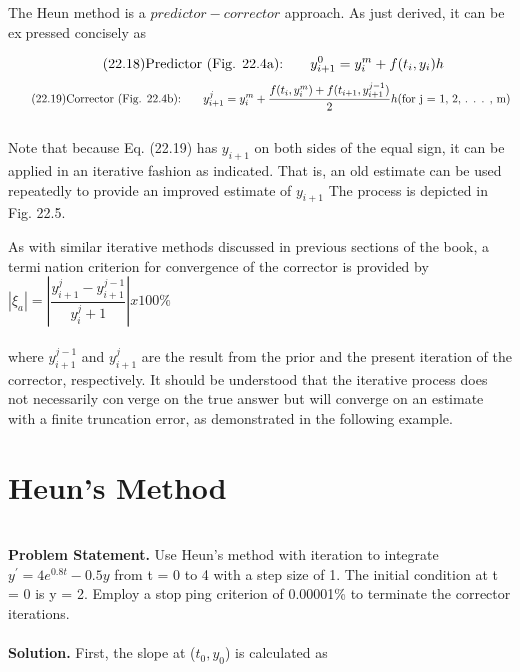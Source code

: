 The Heun method is a $predictor-corrector$ approach. As just derived, it can be expressed concisely as

\begin{equation}
\tag{22.18}
\textnormal{Predictor (Fig. 22.4a):} \; \; \; \; \; \; \; y^{0}_{i+1} = y^{m}_{i} + f(t_{i}, y_{i})h
\end{equation}
\begin{equation}
\tag{22.19}
\textnormal{Corrector (Fig. 22.4b):} \; \; \; \; \; \; \; y^{j}_{i+1} = y^{m}_{i} + \dfrac{ f(t_{i},y^{m}_{i}) + f(t_{i+1},y^{j-1}_{i+1}) }{ 2 }h

\textnormal{(for j = 1, 2, . . . , m)}
\end{equation}\\
Note that because Eq. (22.19) has $y_{i+1}$ on both sides of the equal sign, it can be applied in
an iterative fashion as indicated. That is, an old estimate can be used repeatedly to provide
an improved estimate of $y_{i+1}$ The process is depicted in Fig. 22.5.

As with similar iterative methods discussed in previous sections of the book, a termination criterion for convergence of the corrector is provided by
\\

$|\xi_{a}| = \left| \dfrac{y^{j}_{i+1} - y^{j-1}_{i+1}}{y^{j}_i+1} \right| x 100\% $
\\
\\
where $y^{j-1}_{i+1}$ and $y^{j}_{i+1}$ are the result from the prior and the present iteration of the corrector,
respectively. It should be understood that the iterative process does not necessarily converge on the true answer but will converge on an estimate with a finite truncation error, as
demonstrated in the following example.\\

\vspace{0,3in}
\chapter{Heun’s Method}
\vspace{0,1in}
\hline\\
\vspace{0,1in}
\textbf{Problem Statement.} Use Heun’s method with iteration to integrate $y^{'} = 4e^{0.8t} - 0.5y$ from t = 0 to 4 with a step size of 1. The initial condition at t = 0 is y = 2. Employ a stopping criterion of 0.00001\% to terminate the corrector iterations.
\\
\vspace{0.2in}\\
\textbf{Solution.} First, the slope at ($t_{0}, y_{0}$) is calculated as\\

